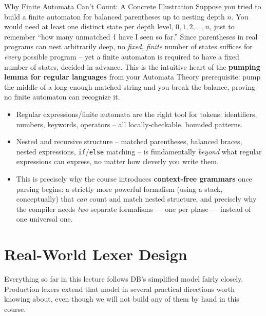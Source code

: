 \documentclass[full-course-notes.tex]{subfiles}
\begin{document}
\begin{examplebox}{Why Finite Automata Can't Count: A Concrete Illustration}
Suppose you tried to build a finite automaton for balanced parentheses up to nesting depth $n$.
You would need at least one distinct state per depth level, $0, 1, 2, \dots, n$, just to
remember ``how many unmatched \texttt{(} have I seen so far.'' Since parentheses in real
programs can nest arbitrarily deep, no \emph{fixed, finite} number of states suffices for
\emph{every} possible program -- yet a finite automaton is required to have a fixed number of
states, decided in advance. This is the intuitive heart of the \textbf{pumping lemma for regular
languages} from your Automata Theory prerequisite: pump the middle of a long enough matched
string and you break the balance, proving no finite automaton can recognize it.
\end{examplebox}

\begin{takeaways}
\begin{itemize}
  \item Regular expressions/finite automata are the right tool for tokens: identifiers,
  numbers, keywords, operators -- all locally-checkable, bounded patterns.
  \item Nested and recursive structure -- matched parentheses, balanced braces, nested
  expressions, \texttt{if}/\texttt{else} matching -- is fundamentally \emph{beyond} what regular
  expressions can express, no matter how cleverly you write them.
  \item This is precisely why the course introduces \textbf{context-free grammars} once parsing
  begins: a strictly more powerful formalism (using a stack, conceptually) that \emph{can}
  count and match nested structure, and precisely why the compiler needs \emph{two} separate
  formalisms --- one per phase --- instead of one universal one.
\end{itemize}
\end{takeaways}

\section{Real-World Lexer Design}
\label{sec:l3-beyond-db}

\beyonddb Everything so far in this lecture follows DB's simplified model fairly closely.
Production lexers extend that model in several practical directions worth knowing about, even
though we will not build any of them by hand in this course.
\end{document}
